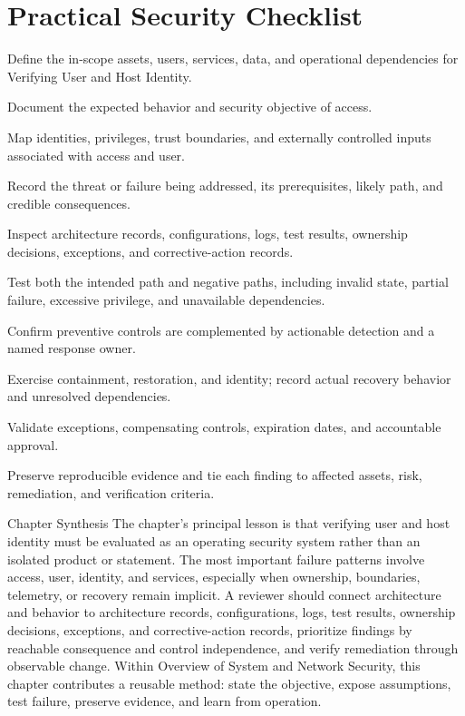 \documentclass[11pt,letterpaper]{article}
\begin{document}
\section*{Practical Security Checklist}
\begin{CornellChecklist}
\item Define the in-scope assets, users, services, data, and operational dependencies for Verifying User and Host Identity.
\item Document the expected behavior and security objective of access.
\item Map identities, privileges, trust boundaries, and externally controlled inputs associated with access and user.
\item Record the threat or failure being addressed, its prerequisites, likely path, and credible consequences.
\item Inspect architecture records, configurations, logs, test results, ownership decisions, exceptions, and corrective-action records.
\item Test both the intended path and negative paths, including invalid state, partial failure, excessive privilege, and unavailable dependencies.
\item Confirm preventive controls are complemented by actionable detection and a named response owner.
\item Exercise containment, restoration, and identity; record actual recovery behavior and unresolved dependencies.
\item Validate exceptions, compensating controls, expiration dates, and accountable approval.
\item Preserve reproducible evidence and tie each finding to affected assets, risk, remediation, and verification criteria.
\end{CornellChecklist}
\begin{CornellSummaryBox}{Chapter Synthesis}
The chapter's principal lesson is that verifying user and host identity must be evaluated as an operating security system rather than an isolated product or statement. The most important failure patterns involve access, user, identity, and services, especially when ownership, boundaries, telemetry, or recovery remain implicit. A reviewer should connect architecture and behavior to architecture records, configurations, logs, test results, ownership decisions, exceptions, and corrective-action records, prioritize findings by reachable consequence and control independence, and verify remediation through observable change. Within Overview of System and Network Security, this chapter contributes a reusable method: state the objective, expose assumptions, test failure, preserve evidence, and learn from operation.
\end{CornellSummaryBox}
\end{document}
